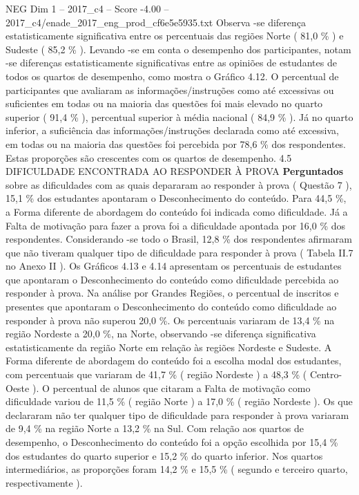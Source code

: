 \begin{textsample}{NEG Dim 1 – 2017\_c4 – Score -4.00 – 2017\_c4/enade\_2017\_eng\_prod\_cf6e5e5935.txt}
Observa -se diferença estatisticamente significativa entre os percentuais das regiões Norte ( 81,0 \% ) e Sudeste ( 85,2 \% ).
Levando -se em conta o desempenho dos participantes, notam -se diferenças estatisticamente significativas entre as opiniões de estudantes de todos os quartos de desempenho, como mostra o Gráfico 4.12.
O percentual de participantes que avaliaram as informações/instruções como até excessivas ou suficientes em todas ou na maioria das questões foi mais elevado no quarto superior ( 91,4 \% ), percentual superior à média nacional ( 84,9 \% ).
Já no quarto inferior, a suficiência das informações/instruções declarada como até excessiva, em todas ou na maioria das questões foi percebida por 78,6 \% dos respondentes.
Estas proporções são crescentes com os quartos de desempenho. 4.5 DIFICULDADE ENCONTRADA AO RESPONDER À PROVA \textbf{Perguntados} sobre as dificuldades com as quais depararam ao responder à prova ( Questão 7 ), 15,1 \% dos estudantes apontaram o Desconhecimento do conteúdo.
Para 44,5 \%, a Forma diferente de abordagem do conteúdo foi indicada como dificuldade.
Já a Falta de motivação para fazer a prova foi a dificuldade apontada por 16,0 \% dos respondentes.
Considerando -se todo o Brasil, 12,8 \% dos respondentes afirmaram que não tiveram qualquer tipo de dificuldade para responder à prova ( Tabela II.7 no Anexo II ).
Os Gráficos 4.13 e 4.14 apresentam os percentuais de estudantes que apontaram o Desconhecimento do conteúdo como dificuldade percebida ao responder à prova.
Na análise por Grandes Regiões, o percentual de inscritos e presentes que apontaram o Desconhecimento do conteúdo como dificuldade ao responder à prova não superou 20,0 \%.
Os percentuais variaram de 13,4 \% na região Nordeste a 20,0 \%, na Norte, observando -se diferença significativa estatisticamente da região Norte em relação às regiões Nordeste e Sudeste.
A Forma diferente de abordagem do conteúdo foi a escolha modal dos estudantes, com percentuais que variaram de 41,7 \% ( região Nordeste ) a 48,3 \% ( Centro-Oeste ).
O percentual de alunos que citaram a Falta de motivação como dificuldade variou de 11,5 \% ( região Norte ) a 17,0 \% ( região Nordeste ).
Os que declararam não ter qualquer tipo de dificuldade para responder à prova variaram de 9,4 \% na região Norte a 13,2 \% na Sul.
Com relação aos quartos de desempenho, o Desconhecimento do conteúdo foi a opção escolhida por 15,4 \% dos estudantes do quarto superior e 15,2 \% do quarto inferior.
Nos quartos intermediários, as proporções foram 14,2 \% e 15,5 \% ( segundo e terceiro quarto, respectivamente ).

\end{textsample}

